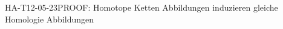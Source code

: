 
\begin{REM}{HA-T12-05-23}{PROOF: Homotope Ketten Abbildungen induzieren gleiche Homologie Abbildungen}
\end{REM}
